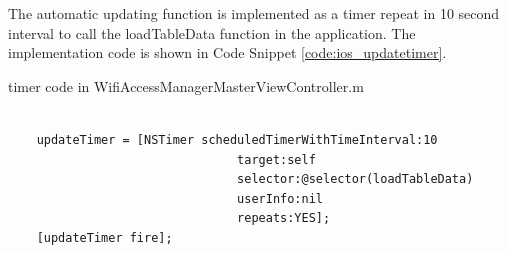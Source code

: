 \par The automatic updating function is implemented as a timer repeat in 10 second interval to call the loadTableData function in the application. The implementation code is shown in Code Snippet \ref{code:ios_updatetimer}.

\begin{algorithm}[h]
  \caption{timer code in WifiAccessManagerMasterViewController.m}
  \label{code:ios_updatetimer}
  \begin{verbatim}
  
    updateTimer = [NSTimer scheduledTimerWithTimeInterval:10 
    							target:self 
    							selector:@selector(loadTableData) 
    							userInfo:nil 
    							repeats:YES];
    [updateTimer fire];
 \end{verbatim}
\end{algorithm}

